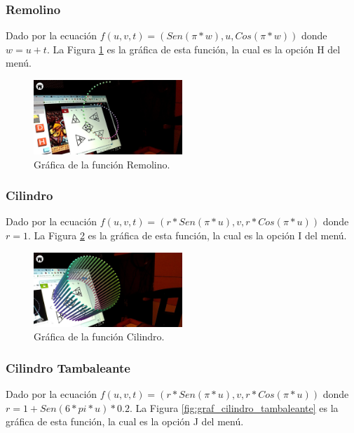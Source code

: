 \subsubsection{Remolino}
Dado por la ecuación $f(u,v,t)=(Sen(\pi * w), u, Cos(\pi * w))$ donde $w = u + t$. La Figura \ref{fig:graf_remolino} es la gráfica de esta función, la cual es la opción H del menú.

\begin{figure}[hbt!]
\centering
\includegraphics[width=0.5\textwidth]{figuras/graficas/remolino.png}
\caption{\label{fig:graf_remolino}Gráfica de la función Remolino.}
\end{figure}
\FloatBarrier

\subsubsection{Cilindro}
Dado por la ecuación $f(u,v,t)=(r*Sen(\pi * u), v, r*Cos(\pi * u))$ donde $r = 1$. La Figura \ref{fig:graf_cilindro} es la gráfica de esta función, la cual es la opción I del menú.

\begin{figure}[hbt!]
\centering
\includegraphics[width=0.5\textwidth]{figuras/graficas/cilindro.png}
\caption{\label{fig:graf_cilindro}Gráfica de la función Cilindro.}
\end{figure}
\FloatBarrier

\subsubsection{Cilindro Tambaleante}
Dado por la ecuación $f(u,v,t)=(r*Sen(\pi * u), v, r*Cos(\pi * u))$ donde $r = 1 + Sen(6 * pi * u) * 0.2$. La Figura \ref{fig:graf_cilindro_tambaleante} es la gráfica de esta función, la cual es la opción J del menú.

